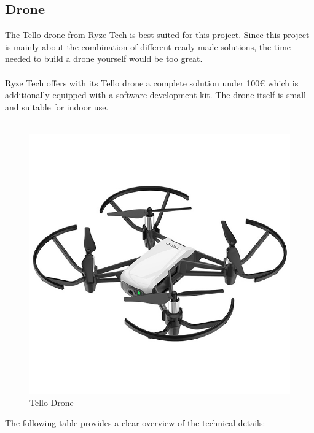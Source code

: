 \documentclass[a4paper,11pt,singlespacing]{article}
\begin{document}
\subsection{Drone}
The Tello drone from Ryze Tech is best suited for this project. Since this project is mainly 
about the combination of different ready-made solutions, the time needed to build a drone yourself would be too great.
\\\\
Ryze Tech offers with its Tello drone a complete solution under 100€ which is additionally equipped with a software development kit. 
The drone itself is small and suitable for indoor use.
\\\\
\begin{figure}[H]
	\centering
	\includegraphics[scale=0.4]{images/tello_front.jpeg}
	\caption{Tello Drone}
	\label{tello_drone}
\end{figure}

The following table provides a clear overview of the technical details:
\end{document}
